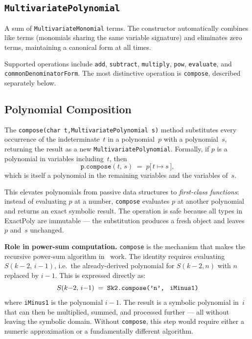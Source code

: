 \documentclass[11pt,a4paper]{article}
\begin{document}
\subsection{\texttt{MultivariatePolynomial}}

A sum of \texttt{MultivariateMonomial} terms.
The constructor automatically combines like terms (monomials sharing the same
variable signature) and eliminates zero terms, maintaining a canonical form at
all times.

Supported operations include \texttt{add}, \texttt{subtract}, \texttt{multiply},
\texttt{pow}, \texttt{evaluate}, and \texttt{commonDenominatorForm}.
The most distinctive operation is \texttt{compose}, described separately below.

\subsection{Polynomial Composition}

The \texttt{compose(char\,t,\;MultivariatePolynomial\,s)} method substitutes
every occurrence of the indeterminate~$t$ in a polynomial~$p$ with a
polynomial~$s$, returning the result as a new \texttt{MultivariatePolynomial}.
Formally, if $p$ is a polynomial in variables including~$t$, then
\[
  \texttt{p.compose}(t,\, s) \;=\; p\bigl[\,t \mapsto s\,\bigr],
\]
which is itself a polynomial in the remaining variables and the variables of~$s$.

This elevates polynomials from passive data structures to \emph{first-class
functions}: instead of evaluating $p$ at a number, \texttt{compose} evaluates
$p$ at another polynomial and returns an exact symbolic result.
The operation is safe because all types in ExactPoly are immutable --- the
substitution produces a fresh object and leaves~$p$ and~$s$ unchanged.

\textbf{Role in power-sum computation.}
\texttt{compose} is the mechanism that makes the recursive power-sum algorithm
in~\cite{trinsit2026} work.
The identity requires evaluating $S(k-2,\,i-1)$, i.e.\ the already-derived
polynomial for $S(k-2,n)$ with $n$ replaced by $i-1$.
This is expressed directly as:
\[
  S(k{-}2,\, i{-}1) \;=\; \texttt{Sk2.compose('n',\; iMinus1)}
\]
where \texttt{iMinus1} is the polynomial $i - 1$.
The result is a symbolic polynomial in~$i$ that can then be multiplied,
summed, and processed further --- all without leaving the symbolic domain.
Without \texttt{compose}, this step would require either a numeric approximation
or a fundamentally different algorithm.
\end{document}
